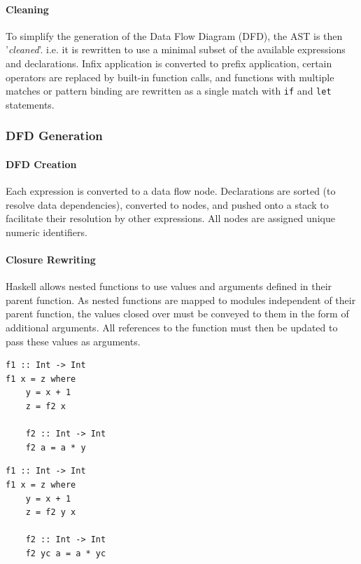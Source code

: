 \documentclass[english,onecolumn]{article}
\begin{document}
\paragraph{Cleaning}
To simplify the generation of the Data Flow Diagram (DFD), the AST is then '\textit{cleaned}'. i.e. it is rewritten to use a minimal subset of the available expressions and declarations. Infix application is converted to prefix application, certain operators are replaced by built-in function calls, and functions with multiple matches or pattern binding are rewritten as a single match with \lstinline{if} and \lstinline{let} statements.

\subsubsection{DFD Generation}
\paragraph{DFD Creation}
Each expression is converted to a data flow node. Declarations are sorted (to resolve data dependencies), converted to nodes, and pushed onto a stack to facilitate their resolution by other expressions. All nodes are assigned unique numeric identifiers.

\paragraph{Closure Rewriting}
Haskell allows nested functions to use values and arguments defined in their parent function. As nested functions are mapped to modules independent of their parent function, the values closed over must be conveyed to them in the form of additional arguments.
All references to the function must then be updated to pass these values as arguments.

\begin{lstlisting}[caption={A nested function with a closure.}, label=lst:closure]
f1 :: Int -> Int
f1 x = z where
    y = x + 1
    z = f2 x

    f2 :: Int -> Int
    f2 a = a * y
\end{lstlisting}

\begin{lstlisting}[caption={The function from Listing \ref{lst:closure}, rewritten to use arguments.}]
f1 :: Int -> Int
f1 x = z where
    y = x + 1
    z = f2 y x

    f2 :: Int -> Int
    f2 yc a = a * yc
\end{lstlisting}
\end{document}
